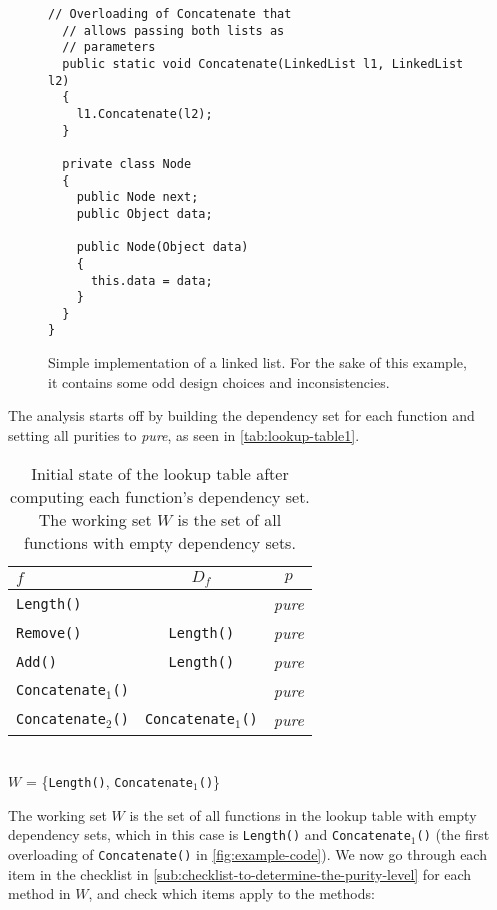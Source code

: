 \documentclass[a4paper,12pt]{article}
\begin{document}
\begin{figure}[H]
\begin{minipage}[t]{0.46\linewidth}
\begin{lstlisting}[basicstyle={\fontsize{8}{9}\ttfamily}]
  // Overloading of Concatenate that
  // allows passing both lists as
  // parameters
  public static void Concatenate(LinkedList l1, LinkedList l2)
  {
    l1.Concatenate(l2);
  }

  private class Node
  {
    public Node next;
    public Object data;

    public Node(Object data)
    {
      this.data = data;
    }
  }
}
    \end{lstlisting}
  \end{minipage}
  \caption{Simple implementation of a linked list. For the sake of this example, it contains some odd design choices and inconsistencies.}
  \label{fig:example-code}
\end{figure}

The analysis starts off by building the dependency set for each function and setting all purities to \textit{pure}, as seen in \autoref{tab:lookup-table1}.

\begin{table}[H]
  \caption{Initial state of the lookup table after computing each function's dependency set. The working set $W$ is the set of all functions with empty dependency sets.}
  \label{tab:lookup-table1}
  \centering
  \begin{tabular}{|l|c|c|}
    \hline
    $f$                         & $D_f$                     & $p$    \\ \hline
    \texttt{Length()}           &                           & \textit{pure} \\
    \texttt{Remove()}           & \texttt{Length()}         & \textit{pure} \\
    \texttt{Add()}              & \texttt{Length()}         & \textit{pure} \\
    \texttt{Concatenate$_1$()}   &                           & \textit{pure} \\
    \texttt{Concatenate$_2$()}   & \texttt{Concatenate$_1$()} & \textit{pure} \\ \hline
  \end{tabular}
  \\
  $W$ = \{\texttt{Length()}, \texttt{Concatenate$_1$()}\}
\end{table}

The working set $W$ is the set of all functions in the lookup table with empty dependency sets, which in this case is \texttt{Length()} and \texttt{Concatenate$_1$()} (the first overloading of \texttt{Concatenate()} in \autoref{fig:example-code}). We now go through each item in the checklist in \autoref{sub:checklist-to-determine-the-purity-level} for each method in $W$, and check which items apply to the methods:
\end{document}
